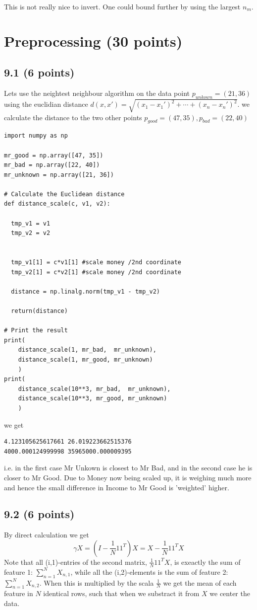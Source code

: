 \documentclass[a4paper,12pt]{article}
\begin{document}
This is not really nice to invert. One could bound further by using the largest $n_m$. 



\section{Preprocessing (30 points)}

\subsection{9.1 (6 points)}
Lets use the neightest neighbour algorithm on the data point $p_{unkown} = (21, 36)$
using the euclidian distance $d(x,x') = \sqrt{(x_1 - x_1')^2 + \cdots + (x_n - x_n')^2}$. we calculate the distance to the two other points $p_{good} = (47, 35), p_{bad} = (22, 40)$

\begin{lstlisting}
import numpy as np

mr_good = np.array([47, 35])
mr_bad = np.array([22, 40])
mr_unknown = np.array([21, 36])

# Calculate the Euclidean distance
def distance_scale(c, v1, v2):

  tmp_v1 = v1
  tmp_v2 = v2


  tmp_v1[1] = c*v1[1] #scale money /2nd coordinate
  tmp_v2[1] = c*v2[1] #scale money /2nd coordinate
  
  distance = np.linalg.norm(tmp_v1 - tmp_v2)

  return(distance)

# Print the result
print(
    distance_scale(1, mr_bad,  mr_unknown),
    distance_scale(1, mr_good, mr_unknown)
    )
print(
    distance_scale(10**3, mr_bad,  mr_unknown),
    distance_scale(10**3, mr_good, mr_unknown)
    )
\end{lstlisting}

we get
\begin{lstlisting}
4.123105625617661 26.019223662515376
4000.000124999998 35965000.000009395
\end{lstlisting}

i.e. in the first case Mr Unkown is closest to Mr Bad, and in the second case he is closer to Mr Good. Due to Money now being scaled up, it is weighing much more and hence the small difference in Income to Mr Good is 'weighted' higher.



\subsection{9.2 (6 points)}
By direct calculation we get
$$
\gamma X = (I - \frac{1}{N}11^T)X = X- \frac{1}{N}11^TX
$$
Note that all (i,1)-entries of the second matrix, $\frac{1}{N}11^TX$, is exeactly the sum of feature 1: $\sum_{n = 1}^N X_{n,1}$, while all the (i,2)-elements is the sum of feature 2: $\sum_{n = 1}^N X_{n,2}$. When this is multiplied by the scala $\frac{1}{N}$ we get the mean of each feature in $N$ identical rows, such that when we substract it from $X$ we center the data.
\end{document}
